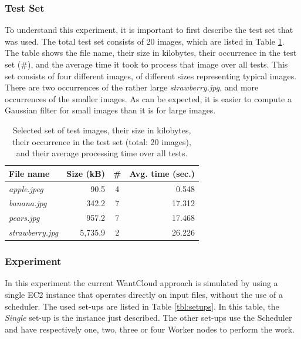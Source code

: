 \documentclass{acm_proc_article-sp}
\begin{document}
\subsubsection{Test Set}
To understand this experiment, it is important to first describe the test set that was used.
The total test set consists of 20 images, which are listed in Table \ref{tbl:tasks}.
The table shows the file name, their size in kilobytes, their occurrence in the test set (\#), and the average time it took to process that image over all tests.
This set consists of four different images, of different sizes representing typical images.
There are two occurrences of the rather large \emph{strawberry.jpg}, and more occurrences of the smaller images.
As can be expected, it is easier to compute a Gaussian filter for small images than it is for large images.

\begin{table}
	\centering
	\begin{tabular}{| l | r | c | r |}
		\hline
		File name & Size (kB) & \# & Avg. time (sec.) \\ \hline \hline
		\emph{apple.jpeg} & 90.5 & 4 & 0.548 \\ \hline
		\emph{banana.jpg} & 342.2 & 7 & 17.312 \\ \hline
		\emph{pears.jpg} & 957.2 & 7 & 17.468 \\ \hline
		\emph{strawberry.jpg} & 5,735.9 & 2 & 26.226 \\ \hline
	\end{tabular}
	\caption{Selected set of test images, their size in kilobytes, their occurrence in the test set (total: 20 images), and their average processing time over all tests.}
	\label{tbl:tasks}
\end{table}

\subsubsection{Experiment}
In this experiment the current WantCloud approach is simulated by using a single EC2 instance that operates directly on input files, without the use of a scheduler.
The used set-ups are listed in Table \ref{tbl:setups}.
In this table, the \emph{Single} set-up is the instance just described.
The other set-ups use the Scheduler and have respectively one, two, three or four Worker nodes to perform the work. 
\end{document}

